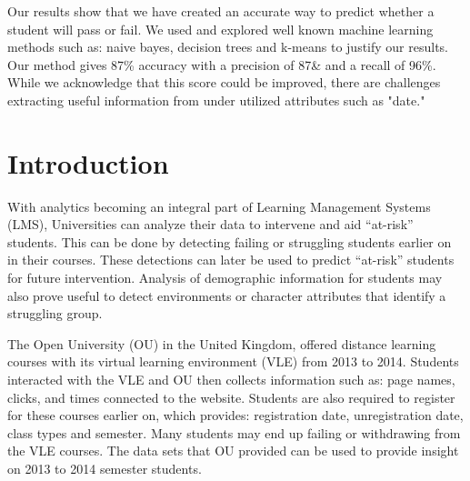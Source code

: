 \documentclass[12pt]{article}
\begin{document}
Our results show that we have created an accurate way to predict whether a student will pass or fail. We used and explored well known machine learning methods such as: naive bayes, decision trees and k-means to justify our results. Our method gives 87\% accuracy with a precision of 87\& and a recall of 96\%. While we acknowledge that this score could be improved, there are challenges extracting useful information from under utilized attributes such as "date." 

%
%

\newpage
\section{Introduction}

With analytics becoming an integral part of Learning Management Systems (LMS), Universities can analyze their data to intervene and aid ``at-risk'' 
students. This can be done by detecting failing or struggling students earlier on in their courses. These detections can later be used to predict ``at-risk''
students for future intervention. Analysis of demographic information for students may also prove useful to detect environments or character
attributes that identify a struggling group.

The Open University (OU) in the United Kingdom, offered distance learning courses with its virtual learning environment (VLE) from 2013 to 2014. Students interacted with 
the VLE and OU then collects information such as: page names, clicks, and times connected to the website. Students are also required to register for these 
courses earlier on, which provides: registration date, unregistration date, class types and semester. Many students may end up failing or withdrawing from the VLE 
courses. The data sets that OU provided can be used to provide insight on 2013 to 2014 semester students. 
\end{document}
